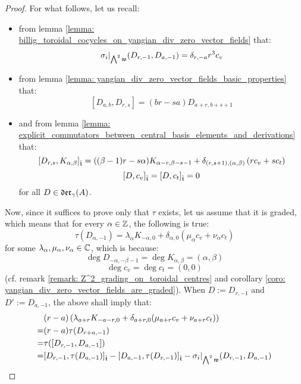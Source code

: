 \begin{proof}
                For what follows, let us recall:
                \begin{itemize}
                    \item from lemma \ref{lemma: billig_toroidal_cocycles_on_yangian_div_zero_vector_fields} that:
                        $$\sigma_i|_{ \bigwedge^2 \frakw }(D_{r, -1}, D_{a, -1}) = \delta_{r, -a} r^3 c_v$$
                    \item from lemma \ref{lemma: yangian_div_zero_vector_fields_basic_properties} that:
                        $$[D_{a, b}, D_{r, s}] = (br - sa) D_{a + r, b + s + 1}$$
                    \item and from lemma \ref{lemma: explicit_commutators_between_central_basis_elements_and_derivations} that:
                        $$[D_{r, s}, K_{\alpha, \beta}]_{\extendedtoroidal} = ((\beta - 1)r - s\alpha) K_{\alpha - r, \beta - s - 1} + \delta_{(r, s + 1), (\alpha, \beta)} \left( r c_v + s c_t \right)$$
                        $$[D, c_v]_{\extendedtoroidal} = [D, c_t]_{\extendedtoroidal} = 0$$
                    for all $D \in \divzero$.
                \end{itemize}
                Now, since it suffices to prove only that $\tau$ exists, let us assume that it is graded, which means that for every $\alpha \in \Z$, the following is true:
                    $$\tau(D_{\alpha, -1}) = \lambda_{\alpha} K_{-\alpha, 0} + \delta_{\alpha, 0}( \mu_{\alpha} c_v + \nu_{\alpha} c_t )$$
                for some $\lambda_{\alpha}, \mu_{\alpha}, \nu_{\alpha} \in \bbC$, which is because:
                    $$\deg D_{-\alpha, -\beta - 1} = \deg K_{\alpha, \beta} = (\alpha, \beta)$$
                    $$\deg c_v = \deg c_t = (0, 0)$$
                (cf. remark \ref{remark: Z^2_grading_on_toroidal_centres} and corollary \ref{coro: yangian_div_zero_vector_fields_are_graded}). When $D := D_{r, -1}$ and $D' := D_{a, -1}$, the above shall imply that:
                    $$
                        \begin{aligned}
                            & (r - a) \left( \lambda_{a + r} K_{-a - r, 0} + \delta_{a + r, 0}( \mu_{a + r} c_v + \nu_{a + r} c_t ) \right)
                            \\
                            = & (r - a) \tau( D_{r + a, -1} )
                            \\
                            = & \tau( [D_{r, -1}, D_{a, -1}] )
                            \\
                            = & [ D_{r, -1}, \tau(D_{a, -1}) ]_{\extendedtoroidal} - [ D_{a, -1}, \tau(D_{r, -1}) ]_{\extendedtoroidal} - \sigma_i|_{\bigwedge^2 \frakw}(D_{r, -1}, D_{a, -1})

\end{aligned}$$
\end{proof}
